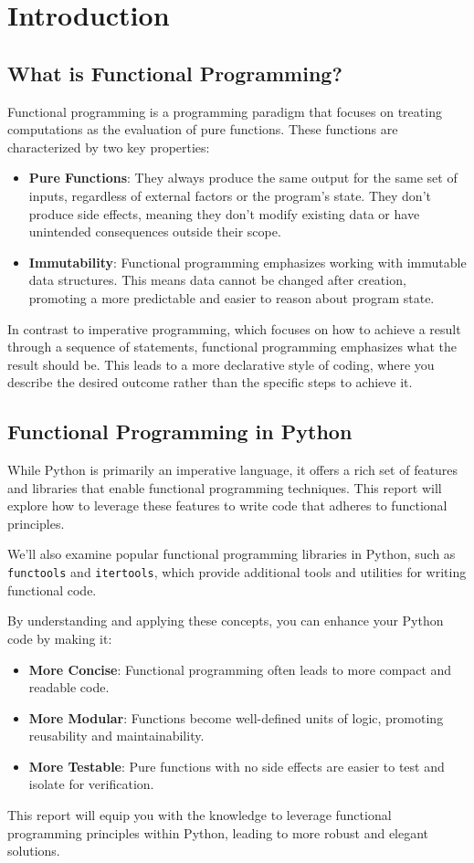 \section{Introduction}
\subsection{What is Functional Programming?}
Functional programming is a programming paradigm that focuses on treating computations as the evaluation of pure functions. These functions are characterized by two key properties:

\begin{itemize}
    \item \textbf{Pure Functions}: They always produce the same output for the same set of inputs, regardless of external factors or the program's state. They don't produce side effects, meaning they don't modify existing data or have unintended consequences outside their scope.
    \item \textbf{Immutability}: Functional programming emphasizes working with immutable data structures. This means data cannot be changed after creation, promoting a more predictable and easier to reason about program state.
\end{itemize}

In contrast to imperative programming, which focuses on how to achieve a result through a sequence of statements, functional programming emphasizes what the result should be. This leads to a more declarative style of coding, where you describe the desired outcome rather than the specific steps to achieve it.

\subsection{Functional Programming in Python}
While Python is primarily an imperative language, it offers a rich set of features and libraries that enable functional programming techniques. This report will explore how to leverage these features to write code that adheres to functional principles.

We'll also examine popular functional programming libraries in Python, such as \texttt{functools} and \texttt{itertools}, which provide additional tools and utilities for writing functional code.

By understanding and applying these concepts, you can enhance your Python code by making it:

\begin{itemize}
    \item \textbf{More Concise}: Functional programming often leads to more compact and readable code.
    \item \textbf{More Modular}: Functions become well-defined units of logic, promoting reusability and maintainability.
    \item \textbf{More Testable}: Pure functions with no side effects are easier to test and isolate for verification.
\end{itemize}

This report will equip you with the knowledge to leverage functional programming principles within Python, leading to more robust and elegant solutions.
